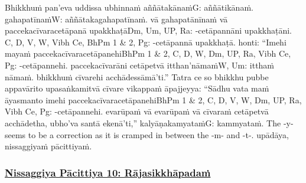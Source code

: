 Bhikkhuṁ pan'eva uddissa ubhinnaṁ aññātakānaṁ\makeatletter\hyperlink{endnote-appendix}\makeatother G: aññātikānaṁ. gahapatīnaṁ\makeatletter\hyperlink{endnote-appendix}\makeatother W: aññātakagahapatīnaṁ. vā gahapatānīnaṁ vā paccekacīvaracetāpanā upakkhaṭā\makeatletter\hyperlink{endnote-appendix}\makeatother Dm, Um, UP, Ra: -cetāpannāni upakkhaṭāni. C, D, V, W, Vibh Ce, BhPm 1 & 2,
Pg: -cetāpannā upakkhaṭā. honti: ``Imehi mayaṁ paccekacīvaracetāpanehi\makeatletter\hyperlink{endnote-appendix}\makeatother BhPm 1 & 2, C, D, W, Dm, UP, Ra, Vibh Ce, Pg: -cetāpannehi. paccekacīvarāni cetāpetvā itthan'nāmaṁ\makeatletter\hyperlink{endnote-appendix}\makeatother W, Um: itthaṁ nāmaṁ. bhikkhuṁ cīvarehi acchādessāmā'ti.'' Tatra ce so bhikkhu pubbe appavārito upasaṅkamitvā cīvare vikappaṁ āpajjeyya: ``Sādhu vata maṁ āyasmanto imehi paccekacīvaracetāpanehi\makeatletter\hyperlink{endnote-appendix}\makeatother BhPm 1 & 2, C, D, V, W, Dm, UP, Ra, Vibh Ce, Pg: -cetāpannehi. evarūpaṁ vā evarūpaṁ vā cīvaraṁ cetāpetvā acchādetha, ubho'va santā ekenā'ti,'' kalyāṇakamyataṁ\makeatletter\hyperlink{endnote-appendix}\makeatother G: kammyataṁ. The -y- seems to be a correction as it is cramped in between the -m- and -t-. upādāya, nissaggiyaṁ pācittiyaṁ.



\subsubsection*{\hyperref[forf-exp10]{Nissaggiya Pācittiya 10: Rājasikkhāpadaṁ}}
\label{np10}

